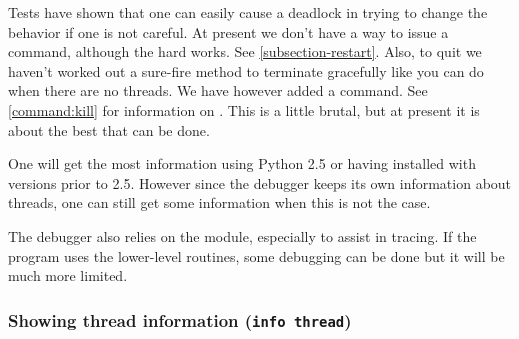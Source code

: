 Tests have shown that one can easily cause a deadlock in trying to
change the behavior if one is not careful. At present we don't have a
way to issue a  command, although the hard 
works. See \ref{subsection-restart}. Also, to quit we haven't worked
out a sure-fire method to terminate gracefully like you can do when
there are no threads. We have however added a  command. See
\ref{command:kill} for information on . This is a little
brutal, but at present it is about the best that can be done.

One will get the most information using Python 2.5 or having
installed with versions prior to 2.5. However since the debugger keeps
its own information about threads, one can still get some information
when this is not the case.

The debugger also relies on the
module, especially to assist in tracing. If the program uses the
lower-level
routines, some debugging can be done but it will be much more limited.

\subsubsection{Showing thread information ({\tt info thread})\label{command:info-thread}}

